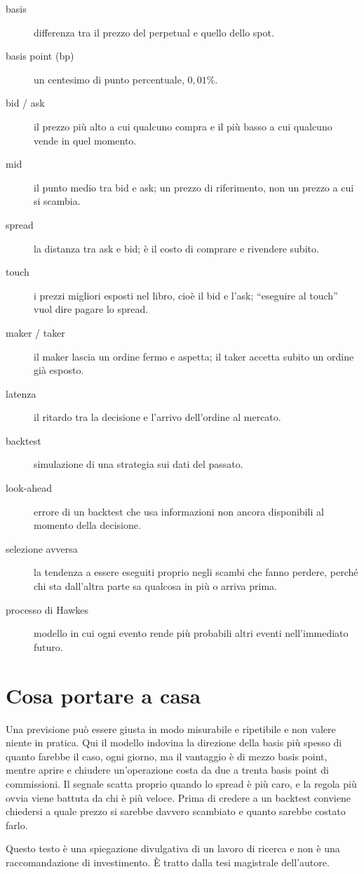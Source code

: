 \documentclass[a4paper,11pt]{article}
\begin{document}
\begin{description}
\item[basis] differenza tra il prezzo del perpetual e quello dello spot.
\item[basis point (bp)] un centesimo di punto percentuale, $0{,}01\%$.
\item[bid / ask] il prezzo più alto a cui qualcuno compra e il più basso a cui qualcuno vende in quel momento.
\item[mid] il punto medio tra bid e ask; un prezzo di riferimento, non un prezzo a cui si scambia.
\item[spread] la distanza tra ask e bid; è il costo di comprare e rivendere subito.
\item[touch] i prezzi migliori esposti nel libro, cioè il bid e l'ask; \enquote{eseguire al touch} vuol dire pagare lo spread.
\item[maker / taker] il maker lascia un ordine fermo e aspetta; il taker accetta subito un ordine già esposto.
\item[latenza] il ritardo tra la decisione e l'arrivo dell'ordine al mercato.
\item[backtest] simulazione di una strategia sui dati del passato.
\item[look-ahead] errore di un backtest che usa informazioni non ancora disponibili al momento della decisione.
\item[selezione avversa] la tendenza a essere eseguiti proprio negli scambi che fanno perdere, perché chi sta dall'altra parte sa qualcosa in più o arriva prima.
\item[processo di Hawkes] modello in cui ogni evento rende più probabili altri eventi nell'immediato futuro.
\end{description}

\section*{Cosa portare a casa}

Una previsione può essere giusta in modo misurabile e ripetibile e non valere niente in pratica. Qui il modello indovina la direzione della basis più spesso di quanto farebbe il caso, ogni giorno, ma il vantaggio è di mezzo basis point, mentre aprire e chiudere un'operazione costa da due a trenta basis point di commissioni. Il segnale scatta proprio quando lo spread è più caro, e la regola più ovvia viene battuta da chi è più veloce. Prima di credere a un backtest conviene chiedersi a quale prezzo si sarebbe davvero scambiato e quanto sarebbe costato farlo.

Questo testo è una spiegazione divulgativa di un lavoro di ricerca e non è una raccomandazione di investimento. È tratto dalla tesi magistrale dell'autore.
\end{document}
